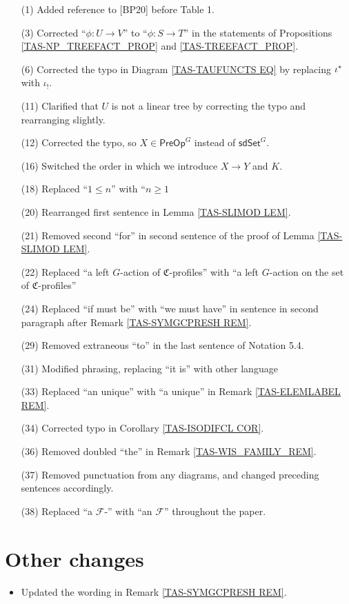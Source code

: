 \documentclass[a4paper,10pt
]{article}%
\numberwithin{equation}{section}
\numberwithin{figure}{section}
\theoremstyle{definition} %
\newcommand{\F}{\ensuremath{\mathcal F}}
\newcommand{\1}{\ensuremath{\mathbbm 1}}%
\begin{document}
\begin{enumerate}
\item[(1)] Added reference to [BP20] before Table 1.
\item[(3)] Corrected ``$\phi \colon U \to V$'' to ``$\phi \colon S \to T$'' in the statements of Propositions \ref{TAS-NP_TREEFACT_PROP} and \ref{TAS-TREEFACT_PROP}.
\item[(6)] Corrected the typo in Diagram \eqref{TAS-TAUFUNCTS EQ} by replacing $\iota^{\**}$ with $\iota_!$.
\item[(11)] Clarified that $U$ is not a linear tree by correcting the typo and rearranging slightly.
\item[(12)] Corrected the typo, so $X \in \mathsf{PreOp}^G$ instead of $\mathsf{sdSet}^G$.
\item[(16)] Switched the order in which we introduce $X \to Y$ and $K$.
\item[(18)] Replaced ``$1 \leq n$'' with ``$n \geq 1$
\item[(20)] Rearranged first sentence in Lemma \ref{TAS-SLIMOD LEM}.
\item[(21)] Removed second ``for'' in second sentence of the proof of Lemma \ref{TAS-SLIMOD LEM}.
\item[(22)] Replaced ``a left $G$-action of $\mathfrak C$-profiles'' with ``a left $G$-action on the set of $\mathfrak C$-profiles''
\item[(24)] Replaced ``if must be'' with ``we must have'' in sentence in second paragraph after Remark \ref{TAS-SYMGCPRESH REM}.
\item[(29)] Removed extraneous ``to'' in the last sentence of Notation 5.4.
\item[(31)] Modified phrasing, replacing ``it is'' with other language
\item[(33)] Replaced ``an unique'' with ``a unique'' in Remark \ref{TAS-ELEMLABEL REM}.
\item[(34)] Corrected typo in Corollary \ref{TAS-ISODIFCL COR}.
\item[(36)] Removed doubled ``the'' in Remark \ref{TAS-WIS_FAMILY_REM}.
\item[(37)] Removed punctuation from any diagrams, and changed preceding sentences accordingly.
\item[(38)] Replaced ``a $\F$-'' with ``an $\F$'' throughout the paper.
\end{enumerate}

\section{Other changes}
\begin{itemize}
\item Updated the wording in Remark \ref{TAS-SYMGCPRESH REM}.
\end{itemize}
\end{document}
